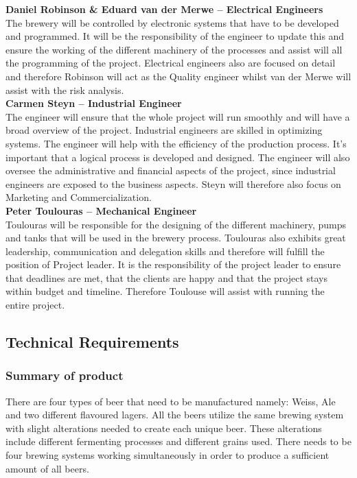 \noindent
\textbf{Daniel Robinson \& Eduard van der Merwe – Electrical Engineers}\\
\noindent
The brewery will be controlled by electronic systems that have to be developed and programmed. It will be the responsibility of the engineer to update this and ensure the working of the different machinery of the processes and assist will all the programming of the project. Electrical engineers also are focused on detail and therefore Robinson will act as the Quality engineer whilst van der Merwe will assist with the risk analysis.\\

\noindent
\textbf{Carmen Steyn – Industrial Engineer}\\
\noindent
The engineer will ensure that the whole project will run smoothly and will have a broad overview of the project. Industrial engineers are skilled in optimizing systems. The engineer will help with the efficiency of the production process. It’s important that a logical process is developed and designed. The engineer will also oversee the administrative and financial aspects of the project, since industrial engineers are exposed to the business aspects. Steyn will therefore also focus on Marketing and Commercialization.\\

\noindent
\textbf{Peter Toulouras – Mechanical Engineer}\\
\noindent
Toulouras will be responsible for the designing of the different machinery, pumps and tanks that will be used in the brewery process. Toulouras also exhibits great leadership, communication and delegation skills and therefore will fulfill the position of Project leader. It is the responsibility of the project leader to ensure that deadlines are met, that the clients are happy and that the project stays within budget and timeline. Therefore Toulouse will assist with running the entire project.


\subsection{Technical Requirements}
\subsubsection{Summary of product}

There are four types of beer that need to be manufactured namely: Weiss, Ale and two different flavoured lagers. All the beers utilize the same brewing system with slight alterations needed to create each unique beer. These alterations include different fermenting processes and different grains used. There needs to be four brewing systems working simultaneously in order to produce a sufficient amount of all beers.

